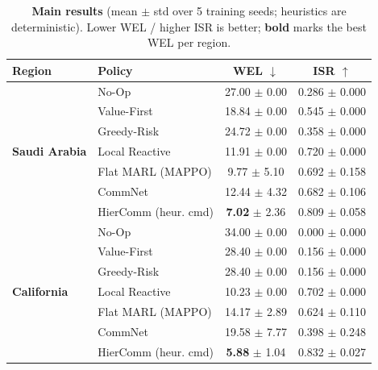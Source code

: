 \begin{table}[t]
\centering
\caption{\textbf{Main results} (mean $\pm$ std over 5 training seeds; heuristics are deterministic). Lower WEL / higher ISR is better; \textbf{bold} marks the best WEL per region.}
\label{tab:main_results}
\begin{tabular}{llcc}
\toprule
Region & Policy & WEL $\downarrow$ & ISR $\uparrow$ \\
\midrule
\multirow{7}{*}{\textbf{Saudi Arabia}}
& No-Op & 27.00 $\pm$ 0.00 & 0.286 $\pm$ 0.000 \\
& Value-First & 18.84 $\pm$ 0.00 & 0.545 $\pm$ 0.000 \\
& Greedy-Risk & 24.72 $\pm$ 0.00 & 0.358 $\pm$ 0.000 \\
& Local Reactive & 11.91 $\pm$ 0.00 & 0.720 $\pm$ 0.000 \\
& Flat MARL (MAPPO) & 9.77 $\pm$ 5.10 & 0.692 $\pm$ 0.158 \\
& CommNet & 12.44 $\pm$ 4.32 & 0.682 $\pm$ 0.106 \\
& HierComm (heur. cmd) & \textbf{7.02} $\pm$ 2.36 & 0.809 $\pm$ 0.058 \\
\midrule
\multirow{7}{*}{\textbf{California}}
& No-Op & 34.00 $\pm$ 0.00 & 0.000 $\pm$ 0.000 \\
& Value-First & 28.40 $\pm$ 0.00 & 0.156 $\pm$ 0.000 \\
& Greedy-Risk & 28.40 $\pm$ 0.00 & 0.156 $\pm$ 0.000 \\
& Local Reactive & 10.23 $\pm$ 0.00 & 0.702 $\pm$ 0.000 \\
& Flat MARL (MAPPO) & 14.17 $\pm$ 2.89 & 0.624 $\pm$ 0.110 \\
& CommNet & 19.58 $\pm$ 7.77 & 0.398 $\pm$ 0.248 \\
& HierComm (heur. cmd) & \textbf{5.88} $\pm$ 1.04 & 0.832 $\pm$ 0.027 \\
\bottomrule
\end{tabular}
\end{table}
